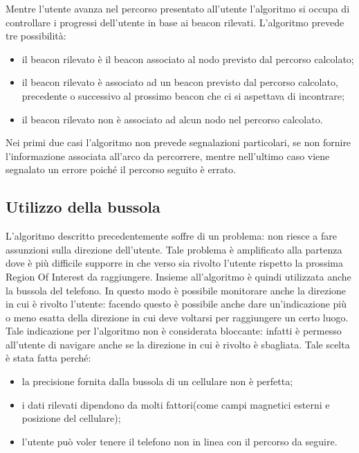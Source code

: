 \documentclass[../SperimentazioniPratiche.tex]{subfiles}
\begin{document}
		Mentre l'utente avanza nel percorso presentato all'utente l'algoritmo si occupa di controllare i progressi dell'utente in base ai beacon rilevati. L'algoritmo prevede tre possibilità:
		\begin{itemize}
			\item il beacon rilevato è il beacon associato al nodo previsto dal percorso calcolato;
			\item il beacon rilevato è associato ad un beacon previsto dal percorso calcolato, precedente o successivo al prossimo beacon che ci si aspettava di incontrare;
			\item il beacon rilevato non è associato ad alcun nodo nel percorso calcolato.
		\end{itemize}
		Nei primi due casi l'algoritmo non prevede segnalazioni particolari, se non fornire l'informazione associata all'arco da percorrere, mentre nell'ultimo caso viene segnalato un errore poiché il percorso seguito è errato.

	\subsection{Utilizzo della bussola}
		L'algoritmo descritto precedentemente soffre di un problema: non riesce a fare assunzioni sulla direzione dell'utente. Tale problema è amplificato alla partenza dove è più difficile supporre in che verso sia rivolto l'utente rispetto la prossima Region Of Interest da raggiungere. Insieme all'algoritmo è quindi utilizzata anche la bussola del telefono. In questo modo è possibile monitorare anche la direzione in cui è rivolto l'utente: facendo questo è possibile anche dare un'indicazione più o meno esatta della direzione in cui deve voltarsi per raggiungere un certo luogo. Tale indicazione per l'algoritmo non è considerata bloccante: infatti è permesso all'utente di navigare anche se la direzione in cui è rivolto è sbagliata. Tale scelta è stata fatta perché:
		\begin{itemize}
			\item la precisione fornita dalla bussola di un cellulare non è perfetta;
			\item i dati rilevati dipendono da molti fattori(come campi magnetici esterni e posizione del cellulare);
			\item l'utente può voler tenere il telefono non in linea con il percorso da seguire.
		\end{itemize}
		
\end{document}
